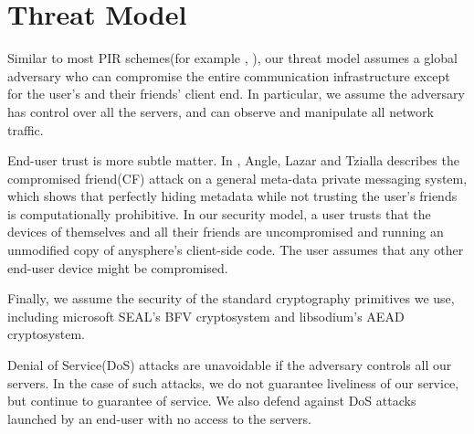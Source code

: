 \section{Threat Model}



Similar to most PIR schemes(for example \cite{ahmad2021addra}, ), our threat model assumes a global adversary who can compromise the entire communication infrastructure except for the user's and their friends' client end. In particular, we assume the adversary has control over all the servers, and can observe and manipulate all network traffic.

End-user trust is more subtle matter. In \cite{angel2018s}, Angle, Lazar and Tzialla describes the compromised friend(CF) attack on a general meta-data private messaging system, which shows that perfectly hiding metadata while not trusting the user's friends is computationally prohibitive. In our security model, a user trusts that the devices of themselves and all their friends are uncompromised and running an unmodified copy of anysphere's client-side code. The user assumes that any other end-user device might be compromised.


Finally, we assume the security of the standard cryptography primitives we use, including microsoft SEAL's BFV cryptosystem and libsodium's AEAD cryptosystem. 

Denial of Service(DoS) attacks are unavoidable if the adversary controls all our servers. In the case of such attacks, we do not guarantee liveliness of our service, but continue to guarantee of service. We also defend against DoS attacks launched by an end-user with no access to the servers.



